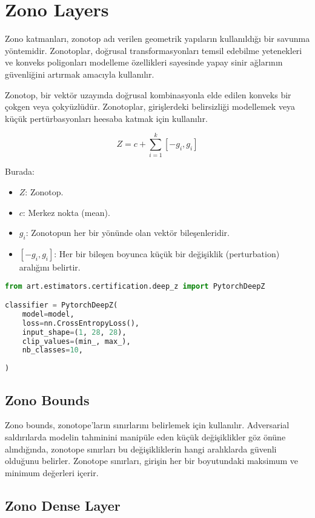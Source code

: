 \section{Zono Layers}

Zono katmanları, zonotop adı verilen geometrik yapıların kullanıldığı bir savunma yöntemidir. Zonotoplar, doğrusal transformasyonları temsil edebilme yetenekleri ve konveks poligonları modelleme özellikleri sayesinde yapay sinir ağlarının güvenliğini artırmak amacıyla kullanılır.

Zonotop, bir vektör uzayında doğrusal kombinasyonla elde edilen konveks bir çokgen veya çokyüzlüdür. Zonotoplar, girişlerdeki belirsizliği modellemek veya küçük pertürbasyonları heesaba katmak için kullanılır.

\[ Z = c + \sum_{i=1}^{k} [-g_i, g_i] \]

Burada:

\begin{itemize}
    \item $Z$: Zonotop.
    \item $c$: Merkez nokta (mean).
    \item $g_i$: Zonotopun her bir yönünde olan vektör bileşenleridir.
    \item $[-g_i, g_i]$: Her bir bileşen boyunca küçük bir değişiklik (perturbation) aralığını belirtir.
\end{itemize}

\begin{lstlisting}[language=Python]
from art.estimators.certification.deep_z import PytorchDeepZ

classifier = PytorchDeepZ(
    model=model,
    loss=nn.CrossEntropyLoss(),
    input_shape=(1, 28, 28),
    clip_values=(min_, max_),
    nb_classes=10,
    
)
\end{lstlisting}

\subsection{Zono Bounds}

Zono bounds, zonotope'ların sınırlarını belirlemek için kullanılır. Adversarial saldırılarda modelin tahminini manipüle eden küçük değişiklikler göz önüne alındığında, zonotope sınırları bu değişikliklerin hangi aralıklarda güvenli olduğunu belirler. Zonotope sınırları, girişin her bir boyutundaki maksimum ve minimum değerleri içerir.

\subsection{Zono Dense Layer}


